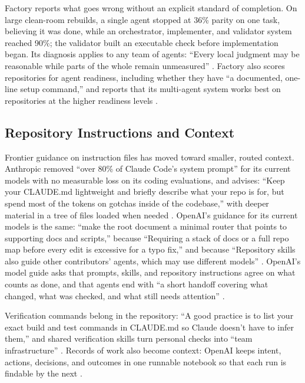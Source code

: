 \documentclass[11pt]{article}
\begin{document}
Factory reports what goes wrong without an explicit standard of completion. On large clean-room rebuilds, a single agent stopped at 36\% parity on one task, believing it was done, while an orchestrator, implementer, and validator system reached 90\%; the validator built an executable check before implementation began. Its diagnosis applies to any team of agents: ``Every local judgment may be reasonable while parts of the whole remain unmeasured'' \cite{factory2026large}. Factory also scores repositories for agent readiness, including whether they have ``a documented, one-line setup command,'' and reports that its multi-agent system works best on repositories at the higher readiness levels \cite{factory2026sandboxes}.

\subsection{Repository Instructions and Context}
Frontier guidance on instruction files has moved toward smaller, routed context. Anthropic removed ``over 80\% of Claude Code's system prompt'' for its current models with no measurable loss on its coding evaluations, and advises: ``Keep your CLAUDE.md lightweight and briefly describe what your repo is for, but spend most of the tokens on gotchas inside of the codebase,'' with deeper material in a tree of files loaded when needed \cite{shihipar2026context}. OpenAI's guidance for its current models is the same: ``make the root document a minimal router that points to supporting docs and scripts,'' because ``Requiring a stack of docs or a full repo map before every edit is excessive for a typo fix,'' and because ``Repository skills also guide other contributors' agents, which may use different models'' \cite{provencher2026astra}. OpenAI's model guide asks that prompts, skills, and repository instructions agree on what counts as done, and that agents end with ``a short handoff covering what changed, what was checked, and what still needs attention'' \cite{openai2026gpt6guide}.

Verification commands belong in the repository: ``A good practice is to list your exact build and test commands in CLAUDE.md so Claude doesn't have to infer them,'' and shared verification skills turn personal checks into ``team infrastructure'' \cite{deoliveira2026verification}. Records of work also become context: OpenAI keeps intent, actions, decisions, and outcomes in one runnable notebook so that each run is findable by the next \cite{lewi2026runme}.
\end{document}
